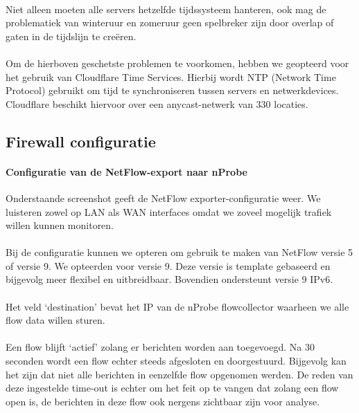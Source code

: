 \paragraph{}
Niet alleen moeten alle servers hetzelfde tijdssysteem hanteren, ook mag de problematiek van winteruur en zomeruur geen spelbreker zijn door overlap of gaten in de tijdslijn te creëren.

\paragraph{}
Om de hierboven geschetste problemen te voorkomen, hebben we geopteerd voor het gebruik van Cloudflare Time Services. Hierbij wordt NTP (Network Time Protocol) gebruikt om tijd te synchroniseren tussen servers en netwerkdevices. Cloudflare beschikt hiervoor over een anycast-netwerk van 330 locaties.

\subsection{Firewall configuratie}

\paragraph{Configuratie van de NetFlow-export naar nProbe}
Onderstaande screenshot geeft de NetFlow exporter-configuratie weer.
We luisteren zowel op LAN als WAN interfaces omdat we zoveel mogelijk trafiek willen kunnen monitoren.

\paragraph{}
Bij de configuratie kunnen we opteren om gebruik te maken van NetFlow versie 5 of versie 9. We opteerden voor versie 9. Deze versie is template gebaseerd en bijgevolg meer flexibel en uitbreidbaar. Bovendien ondersteunt versie 9 IPv6.

\paragraph{}
Het veld ‘destination’ bevat het IP van de nProbe flowcollector waarheen we alle flow data willen sturen.

\paragraph{}
Een flow blijft ‘actief’ zolang er berichten worden aan toegevoegd. Na 30 seconden wordt een flow echter steeds afgesloten en doorgestuurd. Bijgevolg kan het zijn dat niet alle berichten in eenzelfde flow opgenomen werden. De reden van deze ingestelde time-out is echter om het feit op te vangen dat zolang een flow open is, de berichten in deze flow ook nergens zichtbaar zijn voor analyse.

